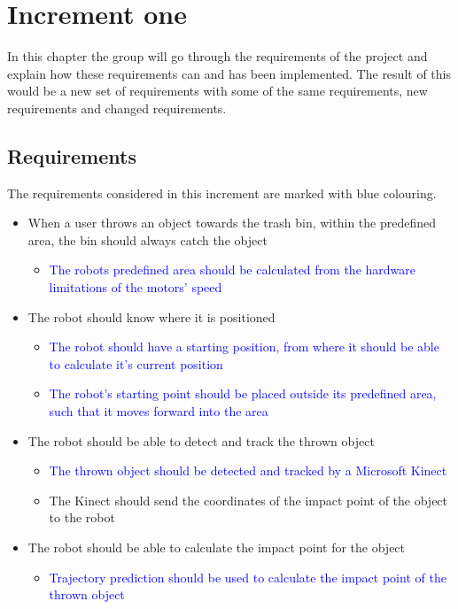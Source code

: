 \chapter{Increment one}
\label{chap:Increment one}
In this chapter the group will go through the requirements of the project and explain how these requirements can and has been implemented. The result of this would be a new set of requirements with some of the same requirements, new requirements and changed requirements.  

\section{Requirements}
\label{sec:i1Requirements}
The requirements considered in this increment are marked with blue colouring.

\begin{itemize}
	\item When a user throws an object towards the trash bin, within the predefined area, the bin should always catch the object
	\begin{itemize}
		\item \textcolor{blue}{The robots predefined area should be calculated from the hardware limitations of the motors’ speed}
	\end{itemize}
	\item The robot should know where it is positioned
	\begin{itemize}
		\item \textcolor{blue}{The robot should have a starting position, from where it should be able to calculate it's current position }
		\item \textcolor{blue}{The robot's starting point should be placed outside its predefined area, such that it moves forward into the area}
	\end{itemize}
	\item The robot should be able to detect and track the thrown object
	\begin{itemize}
		\item \textcolor{blue}{The thrown object should be detected and tracked by a Microsoft Kinect}
		\item The Kinect should send the coordinates of the impact point of the object to the robot
	\end{itemize}
	\item The robot should be able to calculate the impact point for the object
	\begin{itemize}
		\item \textcolor{blue}{Trajectory prediction should be used to calculate the impact point of the thrown object}

\end{itemize}
\end{itemize}
